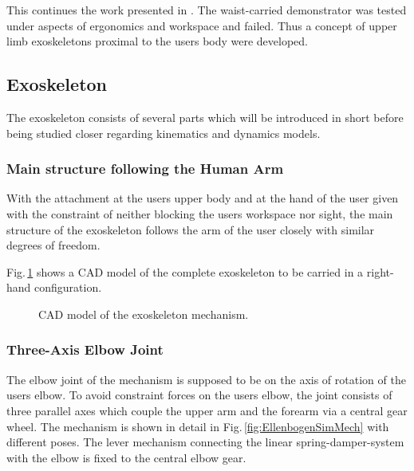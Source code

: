 \documentclass[letterpaper, 10 pt, conference]{ieeeconf}  %
\begin{document}
This continues the work presented in \cite{PetereitAlbJerSch2012}. 
The waist-carried demonstrator was tested under aspects of ergonomics and workspace and failed. Thus a concept of upper limb exoskeletons proximal to the users body were developed.

\subsection{Exoskeleton}

The exoskeleton consists of several parts which will be introduced in short before being studied closer regarding kinematics and dynamics models.

\subsubsection{Main structure following the Human Arm}

With the attachment at the users upper body and at the hand of the user given with the constraint of neither blocking the users workspace nor sight, the main structure of the exoskeleton follows the arm of the user closely with similar degrees of freedom.

Fig.\,\ref{fig:KAS5_CAD} shows a CAD model of the complete exoskeleton to be carried in a right-hand configuration.


\begin{figure}[tb!]
    
    \caption{CAD model of the exoskeleton mechanism.}
    \label{fig:KAS5_CAD}
\end{figure} 

\subsubsection{Three-Axis Elbow Joint}

The elbow joint of the mechanism is supposed to be on the axis of rotation of the users elbow.
To avoid constraint forces on the users elbow, the joint consists of three parallel axes which couple the upper arm and the forearm via a central gear wheel. The mechanism is shown in detail in Fig.\,\ref{fig:EllenbogenSimMech} with different poses.
The lever mechanism connecting the linear spring-damper-system with the elbow is fixed to the central elbow gear.
\end{document}

